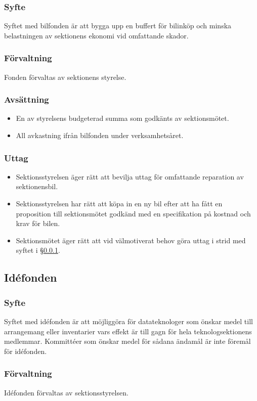 \documentclass[a4paper, 10pt]{article}
\begin{document}
\subsubsection{Syfte}
\label{sec:bilfond_syfte}
Syftet med bilfonden är att bygga upp en buffert för bilinköp och minska belastningen av sektionens ekonomi vid omfattande skador.
\subsubsection{Förvaltning}
Fonden förvaltas av sektionens styrelse.
\subsubsection{Avsättning}
\begin{itemize}
\item En av styrelsens budgeterad summa som godkänts av sektionsmötet.
\item All avkastning ifrån bilfonden under verksamhetsåret.
\end{itemize}
\subsubsection{Uttag}
\begin{itemize}
    \item Sektionsstyrelsen äger rätt att bevilja uttag för omfattande reparation av sektionensbil.
    \item Sektionsstyrelsen har rätt att köpa in en ny bil efter att ha fått en proposition till sektionsmötet godkänd med en specifikation på kostnad och krav för bilen.
    \item Sektionsmötet äger rätt att vid välmotiverat behov göra uttag i strid med syftet i \S\ref{sec:bilfond_syfte}.
\end{itemize}

\subsection{Idéfonden}
\subsubsection{Syfte}
\label{sec:idefond_syfte}
Syftet med idéfonden är att möjliggöra för datateknologer som önskar medel till arrangemang eller inventarier vars effekt är till gagn för hela teknologsektionens medlemmar. Kommittéer som önskar medel för sådana ändamål är inte föremål för idéfonden.
\subsubsection{Förvaltning}
Idéfonden förvaltas av sektionsstyrelsen.
\end{document}
